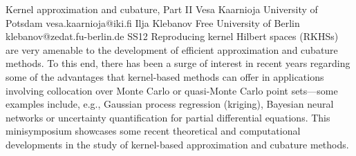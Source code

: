 \documentclass[12pt,a4paper,figuresright]{book}
\begin{document}
\begin{session}
 {Kernel approximation and cubature, Part II}%
 {Vesa Kaarnioja}%
 {University of Potsdam}%
 {vesa.kaarnioja@iki.fi}%
 {Ilja Klebanov}%
 {Free University of Berlin}%
 {klebanov@zedat.fu-berlin.de}%
 {SS12}
 {}%
 Reproducing kernel Hilbert spaces (RKHSs) are very amenable to the development of efficient approximation and cubature methods. To this end, there has been a surge of interest in recent years regarding some of the advantages that kernel-based methods can offer in applications involving collocation over Monte Carlo or quasi-Monte Carlo point sets---some examples include, e.g., Gaussian process regression (kriging), Bayesian neural networks or uncertainty quantification for partial differential equations. This minisymposium showcases some recent theoretical and computational developments in the study of kernel-based approximation and cubature methods.
\end{session}

%


\end{document}
